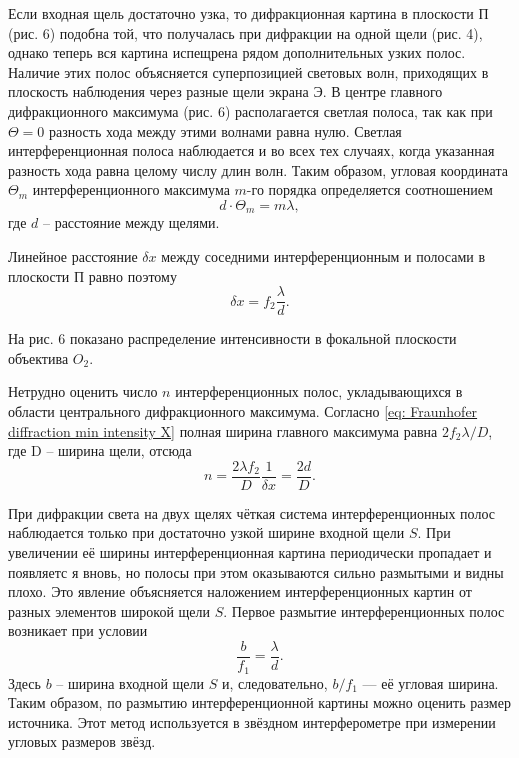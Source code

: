 \documentclass[a4paper,12pt]{article}
\begin{document}
Если входная щель достаточно узка, то дифракционная картина в плоскости $П$ (рис. 6) подобна той, что получалась при дифракции на одной щели (рис. 4), однако теперь вся картина испещрена рядом дополнительных узких полос. Наличие этих полос объясняется суперпозицией световых волн, приходящих в плоскость наблюдения через разные щели экрана $Э$. В центре главного дифракционного максимума (рис. 6) располагается светлая полоса, так как при $\Theta = 0$ разность хода между этими волнами равна нулю. Светлая интерференционная полоса наблюдается и во всех тех случаях, когда указанная разность хода равна целому числу длин волн. Таким образом, угловая координата $\Theta_m$ интерференционного максимума $m$-го порядка определяется соотношением
\begin{equation}\label{eq: Fraunhofer diffraction 2 Theta max}
    d \cdot \Theta_m = m\lambda,
\end{equation}
где $d$ -- расстояние между щелями.

Линейное расстояние $\delta x$ между соседними интерференционным и полосами в плоскости $П$ равно поэтому
\begin{equation}\label{eq: Fraunhofer diffraction 2 deltaX}
    \delta x = f_2 \frac{\lambda}{d}.
\end{equation}

На рис. 6 показано распределение интенсивности в фокальной плоскости объектива
$O_2$.

Нетрудно оценить число $n$ интерференционных полос, укладывающихся в области центрального дифракционного максимума. Согласно \eqref{eq: Fraunhofer diffraction min intensity X} полная ширина главного максимума равна $2f_2\lambda /D$, где D -- ширина щели, отсюда
\begin{equation}\label{eq: Fraunhofer diffraction 2 n in first max}
    n = \frac{2\lambda f_2}{D}\frac{1}{\delta x} = \frac{2d}{D}.
\end{equation}

При дифракции света на двух щелях чёткая система интерференционных полос наблюдается только при достаточно узкой ширине входной щели $S$. При увеличении её ширины интерференционная картина периодически пропадает и появляетс я вновь, но полосы при этом оказываются сильно размытыми и видны плохо. Это явление объясняется наложением интерференционных картин от разных элементов широкой щели
$S$. Первое размытие интерференционных полос возникает при условии
\begin{equation}\label{eq: Fraunhofer 2 diffraction first blur}
    \frac{b}{f_1} = \frac{\lambda}{d}.
\end{equation}
Здесь $b$ -- ширина входной щели $S$ и, следовательно, $b/f_1$ — её угловая ширина. Таким образом, по размытию интерференционной картины можно оценить размер источника. Этот метод используется в звёздном интерферометре при измерении угловых размеров звёзд.
 
\end{document}
